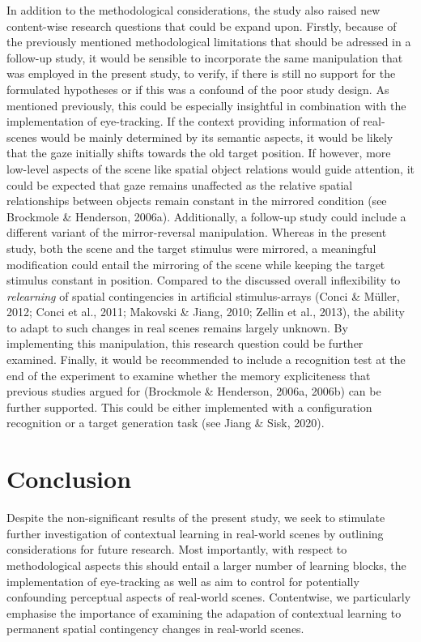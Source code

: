 \documentclass[
  man,floatsintext]{apa7}
\begin{document}
In addition to the methodological considerations, the study also raised new content-wise research questions that could be expand upon. Firstly, because of the previously mentioned methodological limitations that should be adressed in a follow-up study, it would be sensible to incorporate the same manipulation that was employed in the present study, to verify, if there is still no support for the formulated hypotheses or if this was a confound of the poor study design. As mentioned previously, this could be especially insightful in combination with the implementation of eye-tracking. If the context providing information of real-scenes would be mainly determined by its semantic aspects, it would be likely that the gaze initially shifts towards the old target position. If however, more low-level aspects of the scene like spatial object relations would guide attention, it could be expected that gaze remains unaffected as the relative spatial relationships between objects remain constant in the mirrored condition (see Brockmole \& Henderson, 2006a). Additionally, a follow-up study could include a different variant of the mirror-reversal manipulation. Whereas in the present study, both the scene and the target stimulus were mirrored, a meaningful modification could entail the mirroring of the scene while keeping the target stimulus constant in position. Compared to the discussed overall inflexibility to \emph{relearning} of spatial contingencies in artificial stimulus-arrays (Conci \& Müller, 2012; Conci et al., 2011; Makovski \& Jiang, 2010; Zellin et al., 2013), the ability to adapt to such changes in real scenes remains largely unknown. By implementing this manipulation, this research question could be further examined. Finally, it would be recommended to include a recognition test at the end of the experiment to examine whether the memory expliciteness that previous studies argued for (Brockmole \& Henderson, 2006a, 2006b) can be further supported. This could be either implemented with a configuration recognition or a target generation task (see Jiang \& Sisk, 2020).

\hypertarget{conclusion}{%
\section{Conclusion}\label{conclusion}}

Despite the non-significant results of the present study, we seek to stimulate further investigation of contextual learning in real-world scenes by outlining considerations for future research. Most importantly, with respect to methodological aspects this should entail a larger number of learning blocks, the implementation of eye-tracking as well as aim to control for potentially confounding perceptual aspects of real-world scenes. Contentwise, we particularly emphasise the importance of examining the adapation of contextual learning to permanent spatial contingency changes in real-world scenes.
\end{document}
